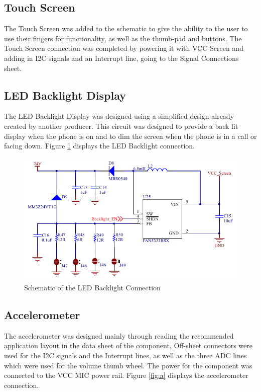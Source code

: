 \subsection{Touch Screen}
\label{chap:touch}

	The Touch Screen was added to the schematic to give the ability to the user to use their fingers for functionality, as well as the thumb-pad and buttons. 
The Touch Screen connection was completed by powering it with VCC Screen and adding in I2C signals and an Interrupt line, going to the Signal Connections sheet.

\subsection{LED Backlight Display}

	The LED Backlight Display was designed using a simplified design already created by another producer. This circuit was designed to provide a back lit display when the phone is on and to dim the screen when the phone is in a call or facing down.
Figure \ref{fig:backlight} displays the LED Backlight connection. 

\begin{figure}
	\includegraphics[width=0.5\linewidth]{Figures/LED_backlight.pdf}\centering
	\caption{Schematic of the LED Backlight Connection}
	\label{fig:backlight}
\end{figure}

\subsection{Accelerometer}
\label{chap:a}

	The accelerometer was designed mainly through reading the recommended application layout in the data sheet of the component. Off-sheet connectors were used for the I2C signals and the Interrupt lines, as well as the three ADC lines which were used for the volume thumb wheel. The power for the component was connected to the VCC MIC power rail.
Figure \ref{fig:a} displays the accelerometer connection. 

